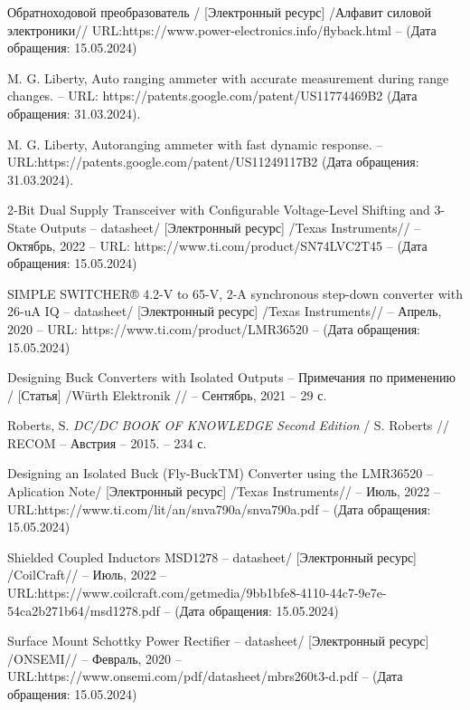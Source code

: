 \begin{thebibliography}{00}
 Обратноходовой преобразователь /
  [Электронный ресурс] /Алфавит силовой электроники// 
   URL:https://www.power-electronics.info/flyback.html --
  (Дата обращения: 15.05.2024)

 M. G. Liberty, Auto ranging ammeter with accurate measurement 
during range changes. -- URL:
https://patents.google.com/patent/US11774469B2 (Дата обращения: 31.03.2024).

 M. G. Liberty, Autoranging ammeter with fast dynamic response.
-- URL:https://patents.google.com/patent/US11249117B2 (Дата обращения: 31.03.2024).


 2-Bit Dual Supply Transceiver with Configurable 
Voltage-Level Shifting and 3-State Outputs
 -- datasheet/
  [Электронный ресурс] /Texas Instruments// -- Октябрь, 2022 -- 
  URL: https://www.ti.com/product/SN74LVC2T45
   -- (Дата обращения: 15.05.2024)

 SIMPLE SWITCHER® 4.2-V to 65-V, 
2-A synchronous step-down converter with 26-uA IQ
  -- datasheet/
  [Электронный ресурс] /Texas Instruments// -- Апрель, 2020 -- 
  URL: https://www.ti.com/product/LMR36520
  -- (Дата обращения: 15.05.2024)

Designing Buck Converters with Isolated Outputs 
-- Примечания по применению /
[Статья] /Würth Elektronik // -- Сентябрь, 2021 -- 29 с.

 Roberts, S.
\emph{DC/DC BOOK OF KNOWLEDGE Second Edition} / S. Roberts // RECOM --
Австрия -- 2015. -- 234 с.

 Designing an Isolated Buck (Fly-BuckTM) Converter using
the LMR36520
  -- Aplication Note/
  [Электронный ресурс] /Texas Instruments// -- Июль, 2022 -- 
  URL:https://www.ti.com/lit/an/snva790a/snva790a.pdf
  -- (Дата обращения: 15.05.2024)


 Shielded Coupled Inductors MSD1278
-- datasheet/
[Электронный ресурс] /CoilCraft// -- Июль, 2022 -- 
URL:https://www.coilcraft.com/getmedia/9bb1bfe8-4110-44c7-9e7e-54ca2b271b64/msd1278.pdf
-- (Дата обращения: 15.05.2024)

 Surface Mount Schottky Power Rectifier
-- datasheet/
[Электронный ресурс] /ONSEMI// -- Февраль, 2020 -- 
URL:https://www.onsemi.com/pdf/datasheet/mbrs260t3-d.pdf
-- (Дата обращения: 15.05.2024)


\end{thebibliography}
